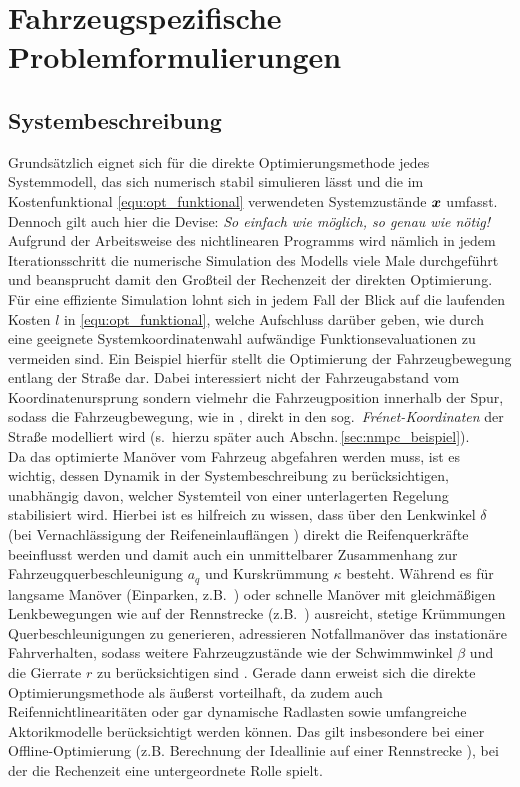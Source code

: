 \section{Fahrzeugspezifische Problemformulierungen}
\subsection{Systembeschreibung} \label{sec:direkte_methode_systembeschreibung}
Grundsätzlich eignet sich für die direkte Optimierungsmethode jedes Systemmodell, das sich numerisch stabil simulieren lässt und die im Kostenfunktional \eqref{equ:opt_funktional} verwendeten Systemzustände $\boldsymbol{x}$ umfasst. Dennoch gilt auch hier die Devise: \emph{So einfach wie möglich, so genau wie nötig!} Aufgrund der  Arbeitsweise des nichtlinearen Programms wird nämlich in jedem Iterationsschritt die numerische Simulation des Modells viele Male durchgeführt und beansprucht damit den Großteil der Rechenzeit der direkten Optimierung. Für eine effiziente Simulation lohnt sich in jedem Fall der Blick auf die laufenden Kosten $l$ in \eqref{equ:opt_funktional}, welche  Aufschluss darüber geben, wie durch eine geeignete Systemkoordinatenwahl aufwändige Funktionsevaluationen zu vermeiden sind. Ein Beispiel hierfür stellt die Optimierung der Fahrzeugbewegung entlang der Straße dar. Dabei interessiert nicht der Fahrzeugabstand vom Koordinatenursprung sondern vielmehr die Fahrzeugposition innerhalb der Spur, sodass die Fahrzeugbewegung, wie in \cite{preusse2001fahrzeugfuhrung, schmidt2012hierarchischer}, direkt in den sog.\ \emph{Frénet-Koordinaten} der Straße modelliert wird (s.\ hierzu später auch Abschn.\,\ref{sec:nmpc_beispiel}). \\
Da das optimierte Manöver vom Fahrzeug abgefahren werden muss, ist es wichtig, dessen Dynamik in der Systembeschreibung zu berücksichtigen, unabhängig davon, welcher Systemteil von einer unterlagerten Regelung stabilisiert wird.  Hierbei ist es hilfreich zu wissen, dass über den Lenkwinkel $\delta$ (bei Vernachlässigung der Reifeneinlauflängen \cite{mitschke2004dynamik}) direkt die Reifenquerkräfte beeinflusst werden und damit auch ein unmittelbarer Zusammenhang zur Fahrzeugquerbeschleunigung $a_q$ und Kurskrümmung $\kappa$ besteht. Während es für langsame Manöver (Einparken, z.B.\ \cite{kelly2003reactive}) oder schnelle Manöver mit gleichmäßigen Lenkbewegungen wie auf der Rennstrecke (z.B.\ \cite{Konig2008, gerdts2009generating}) ausreicht, stetige Krümmungen \bzw Querbeschleunigungen zu generieren, adressieren Notfallmanöver das instationäre Fahrverhalten, sodass weitere Fahrzeugzustände wie der Schwimmwinkel $\beta$ und die Gierrate $r$ zu berücksichtigen sind 
\cite{Falcone2007, park2009obstacle, schmidt2012hierarchischer, Yoon2009, nanao2011vehicle}. 
Gerade dann erweist sich die direkte Optimierungsmethode als äußerst vorteilhaft, da zudem auch Reifennichtlinearitäten 
\cite{gerdts2009generating, Yoon2009} oder gar dynamische Radlasten \cite{Falcone2007, Frasch2013b}
sowie umfangreiche Aktorikmodelle berücksichtigt werden können. Das gilt insbesondere bei einer Offline-Optimierung (z.B. Berechnung der Ideallinie auf einer Rennstrecke \cite{gerdts2009generating}), bei der die Rechenzeit eine untergeordnete Rolle spielt.

